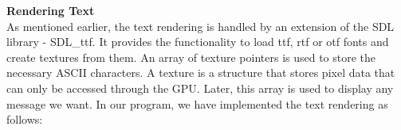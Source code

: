 \documentclass[report]{subfiles}
\begin{document}
    \textbf{Rendering Text}\\
    As mentioned earlier, the text rendering is handled by an extension of the SDL library - SDL\_ttf. It provides the functionality to load ttf, rtf or otf fonts and create textures from them. An array of texture pointers is used to store the necessary ASCII characters. A texture is a structure that stores pixel data that can only be accessed through the GPU. Later, this array is used to display any message we want.
    In our program, we have implemented the text rendering as follows:\\
\end{document}
